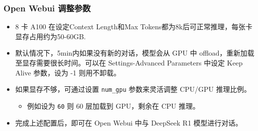\begin{frame}
\frametitle{Open Webui 调整参数}
\begin{itemize}
    \item 8 卡 A100 在设定Context Length和Max Tokens都为8k后可正常推理，每张卡显存占用约为50-60GB.
    \item 默认情况下，5min内如果没有新的对话，模型会从 GPU 中 offload，重新加载至显存需要很长时间。可以在 Settings-Advanced Parameters 中设定 Keep Alive 参数，设为 -1 则用不卸载。
    \item  如果显存不够，可通过设置 \texttt{num\_gpu} 参数来灵活调整 CPU/GPU 推理比例。
        \begin{itemize}
            \item 例如设为 \texttt{60} 则 60 层加载到 GPU，剩余在 CPU 推理。
        \end{itemize}
		\item 完成上述配置后，即可在 Open Webui 中与 DeepSeek R1 模型进行对话。
\end{itemize}
\end{frame}

    
